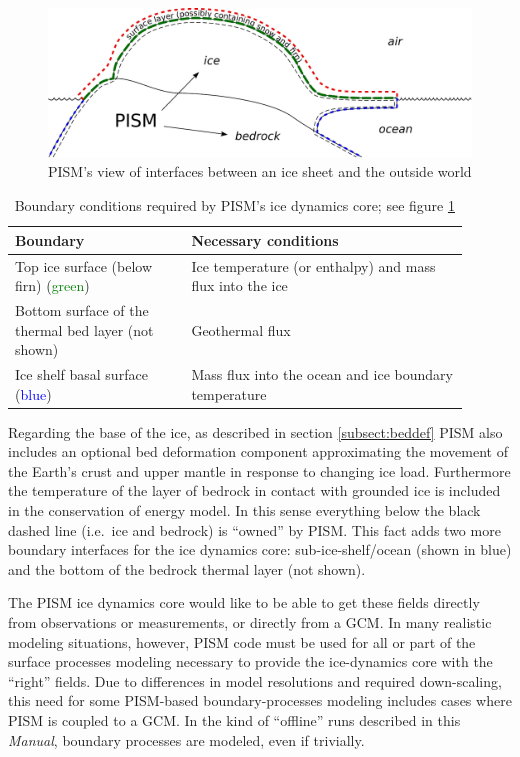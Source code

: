\documentclass[titlepage,letterpaper,final]{scrartcl}
\begin{document}
\begin{figure}
  \centering
  \includegraphics[width=6in]{figs/climate-cartoon.pdf}
  \caption{PISM's view of interfaces between an ice sheet and the outside world}
  \label{fig:climate-inputs}
\end{figure}

\begin{table}[h]
  \centering
  \begin{tabular}{p{0.35\linewidth}p{0.55\linewidth}}\\
    \hline
    \textbf{Boundary} & \textbf{Necessary conditions}\\
    \hline
    Top ice surface (below firn) (\textcolor{green}{green})& Ice temperature (or enthalpy) and mass flux into the ice\\
    Bottom surface of the thermal bed layer (not shown) & Geothermal flux\\
    Ice shelf basal surface (\textcolor{blue}{blue})& Mass flux into the ocean and ice boundary temperature\\
   \hline
  \end{tabular}
  \caption{Boundary conditions required by PISM's ice dynamics core; see figure
  \ref{fig:climate-inputs}}
  \label{tab:ice-dynamics-bc}
\end{table}

Regarding the base of the ice, as described in section \ref{subsect:beddef} PISM also includes an optional bed deformation component approximating the movement of the Earth's crust and upper mantle in response to changing ice load.   Furthermore the temperature of the layer of bedrock in contact with grounded ice is included in the conservation of energy model.  In this sense everything below the black dashed line (i.e.~ice and bedrock) is ``owned'' by PISM.  This fact adds two more boundary interfaces for the ice dynamics core: sub-ice-shelf/ocean (shown in blue) and the bottom of the bedrock thermal layer (not shown).

The PISM ice dynamics core would like to be able to get these fields directly from observations or measurements, or directly from a GCM.  In many realistic modeling situations, however, PISM code must be used for all or part of the surface processes modeling necessary to provide the ice-dynamics core with the ``right'' fields.  Due to differences in model resolutions and required down-scaling, this need for some PISM-based boundary-processes modeling includes cases where PISM is coupled to a GCM.  In the kind of ``offline'' runs described in this \emph{Manual}, boundary processes are modeled, even if trivially.
\end{document}
